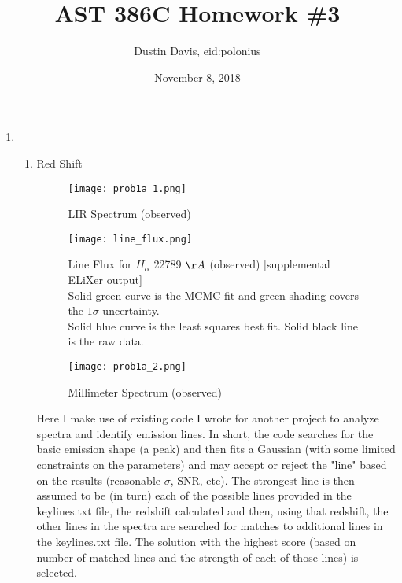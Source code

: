 \documentclass[11pt]{article}
\title{AST 386C Homework \#3}
\author{Dustin Davis, eid:polonius}
\date{November 8, 2018}
\begin{document}
\maketitle



\newpage 



\begin{enumerate}
\item  %
	
	\begin{enumerate}
	\item Red Shift\\
	
    \begin{figure}[H]
		\texttt{[image: prob1a\_1.png]}
		\caption{LIR Spectrum (observed)}
		\label{}
	\end{figure}
	
		\begin{figure}[H]
				\texttt{[image: line\_flux.png]}
				\caption{Line Flux for $H_{\alpha}$  22789 $\AA$ (observed) [supplemental ELiXer output] \\ Solid green curve is the MCMC fit and green shading covers the $1\sigma$ uncertainty. \\ Solid blue curve is the least squares best fit. Solid black line is the raw data. }
				\label{fig:int_line_flux}
		\end{figure}
	
	\begin{figure}[H]
			\texttt{[image: prob1a\_2.png]}
			\caption{Millimeter Spectrum (observed)}
			\label{fig:gal_mm_spec}
	\end{figure}
	  
	Here I make use of existing code I wrote for another project to analyze spectra and identify emission lines. In short, the code searches for the basic emission shape (a peak) and then fits a Gaussian (with some limited constraints on the parameters) and may accept or reject the "line" based on the results (reasonable $\sigma$, SNR, etc). The strongest line is then assumed to be (in turn) each of the possible lines provided in the keylines.txt file, the redshift calculated and then, using that redshift, the other lines in the spectra are searched for matches to additional lines in the keylines.txt file. The solution with the highest score (based on number of matched lines and the strength of each of those lines) is selected.\\
	

\end{enumerate}
\end{enumerate}
\end{document}
